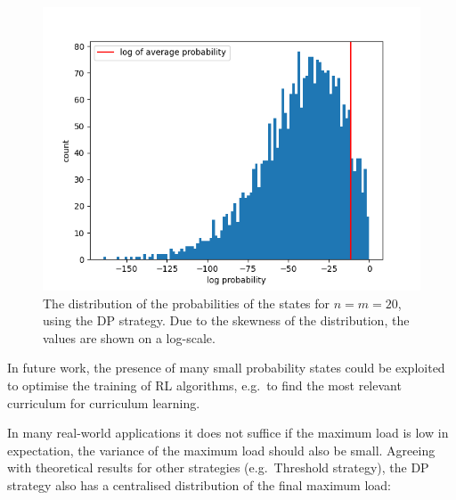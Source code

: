 \begin{figure}[hbt!] \label{two-thinning-state-distribution}
    \centering
    \includegraphics[scale=1.0]{Chapter4/Figs/state_distribution_20_20_all_log_count.png}
    \caption{The distribution of the probabilities of the states for $n=m=20$, using the DP strategy. Due to the skewness of the distribution, the values are shown on a log-scale.}
\end{figure}


In future work, the presence of many small probability states could be exploited to optimise the training of RL algorithms, e.g.\ to find the most relevant curriculum for curriculum learning. 


In many real-world applications it does not suffice if the maximum load is low in expectation, the variance of the maximum load should also be small. Agreeing with theoretical results for other strategies (e.g.\ Threshold strategy), the DP strategy also has a centralised distribution of the final maximum load:


